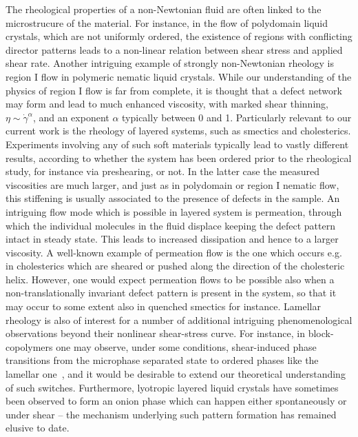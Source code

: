 \documentclass[8.5pt,twoside,twocolumn]{article}
\begin{document}
The rheological properties of a non-Newtonian fluid are often linked to the microstrucure of the material. For instance, in the flow of polydomain liquid crystals, which are not uniformly ordered, the existence of regions with conflicting director patterns leads to a non-linear relation between shear stress and applied shear rate. Another intriguing example of strongly non-Newtonian rheology is region I flow in polymeric nematic liquid crystals. While our understanding of the physics of region I flow is far from complete, it is thought that a defect network may form and lead to much enhanced viscosity, with marked shear thinning, $\eta \sim \dot{\gamma}^{\alpha}$, and an exponent $\alpha$ typically between 0 and 1. Particularly relevant to our current work is the rheology of layered systems, such as smectics and cholesterics. Experiments involving any of such soft materials typically lead to vastly different results, according to whether the system has been ordered prior to the rheological study, for instance via preshearing, or not. In the latter case the measured viscosities are much larger, and just as in polydomain or region I nematic flow, this stiffening is usually associated to the presence of defects in the sample. An intriguing flow mode which is possible in layered system is permeation, through which the individual molecules in the fluid displace keeping the defect pattern intact in steady state. This leads to increased dissipation and hence to a larger viscosity. A well-known example of permeation flow is the one which occurs e.g. in cholesterics which are sheared or pushed along the direction of the cholesteric helix. However, one would expect permeation flows to be possible also when a non-translationally invariant defect pattern is present in the system, so that it may occur to some extent also in quenched smectics for instance.
Lamellar rheology is also of interest for a number of additional intriguing phenomenological observations beyond their nonlinear shear-stress curve. For instance, in block-copolymers one may observe, under some conditions, shear-induced phase transitions from the microphase separated state to ordered phases like the lamellar one~\cite{Cates89,Koppi93,Fredrickson94}, and it would be desirable to extend our theoretical understanding of such switches. Furthermore, lyotropic layered liquid crystals have sometimes been observed to form an onion phase \cite{Panizza96,Iwashita07} which can happen either spontaneously \cite{Gomati87,Boltenhagen92,Fournier94,Ramos04} or under shear \cite{Diat93} -- the mechanism underlying such pattern formation has remained elusive to date. 
\end{document}
